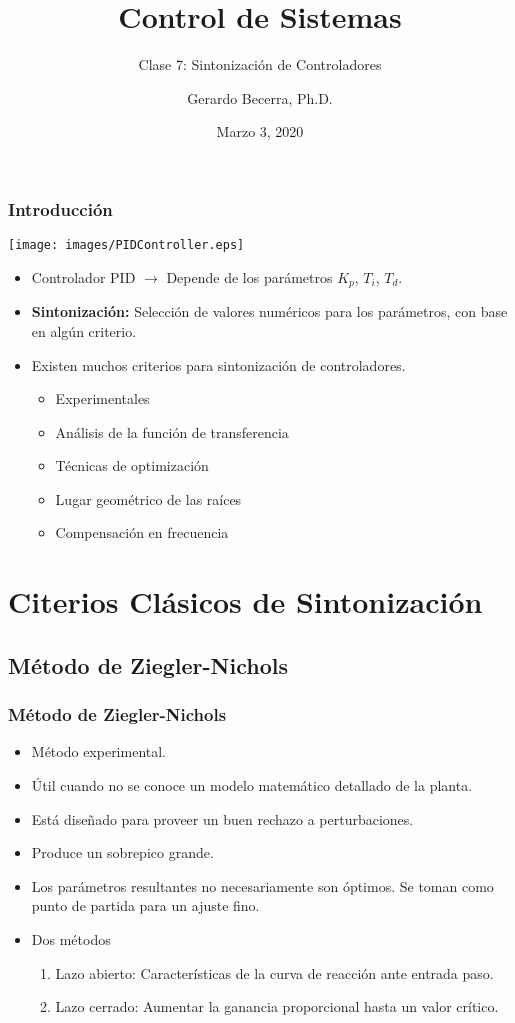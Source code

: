 \documentclass[aspectratio=169]{beamer}
\title{Control de Sistemas}
\subtitle{\small Clase 7: Sintonización de Controladores}
\author{Gerardo Becerra, Ph.D.}
\institute{Pontificia Universidad Javeriana\\ Departamento de Electrónica}
\date{Marzo 3, 2020}
\theoremstyle{definition}
\theoremstyle{plain}
\theoremstyle{remark}
\begin{document}
\frame{\titlepage}	


\begin{frame}[<+->]\frametitle{Introducción}
\vspace*{5mm}
\centering
\texttt{[image: images/PIDController.eps]}
\begin{itemize}
	\item Controlador PID $\rightarrow$ Depende de los parámetros $K_p$, $T_i$, $T_d$.
	\item \textbf{Sintonización:} Selección de valores numéricos para los parámetros, con base en algún criterio.
	\item Existen muchos criterios para sintonización de controladores.
	\begin{itemize}
		\item Experimentales
		\item Análisis de la función de transferencia
		\item Técnicas de optimización
		\item Lugar geométrico de las raíces
		\item Compensación en frecuencia
	\end{itemize}
\end{itemize}
\end{frame}

\section{Citerios Clásicos de Sintonización}
\subsection{Método de Ziegler-Nichols}
\begin{frame}[<+->]\frametitle{Método de Ziegler-Nichols}
\begin{itemize}
	\item Método experimental.
	\item Útil cuando no se conoce un modelo matemático detallado de la planta.
	\item Está diseñado para proveer un buen rechazo a perturbaciones.
	\item Produce un sobrepico grande.
	\item Los parámetros resultantes no necesariamente son óptimos. Se toman como punto de partida para un ajuste fino.
	\item Dos métodos
	\begin{enumerate}
		\item Lazo abierto: Características de la curva de reacción ante entrada paso.
		\item Lazo cerrado: Aumentar la ganancia proporcional hasta un valor crítico.
	\end{enumerate}
\end{itemize}
\end{frame}
\end{document}
